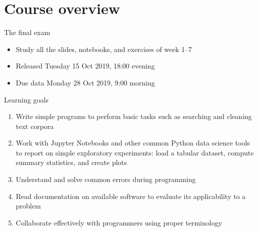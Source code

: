 \documentclass[aspectratio=169,usenames,dvipsnames]{beamer}
\begin{document}
\section{Course overview}
\frame{\tableofcontents[currentsubsection]}

\begin{frame}{The final exam}
    \begin{itemize}
        \item Study all the slides, notebooks, and exercises of week 1--7
        \item Released Tuesday 15 Oct 2019, 18:00 evening
        \item Due data Monday 28 Oct 2019, 9:00 morning
    \end{itemize}
\end{frame}

\begin{frame}{Learning goals}
    \begin{enumerate}
        \item Write simple programs to perform basic tasks such as searching
            and cleaning text corpora
        \item Work with Jupyter Notebooks and other common Python data science
            tools to report on simple exploratory experiments:
            load a tabular dataset, compute summary statistics,
            and create plots
        \item Understand and solve common errors during programming
        \item Read documentation on available software to evaluate its
            applicability to a problem
        \item Collaborate effectively with programmers using proper terminology
    \end{enumerate}
\end{frame}
\end{document}
